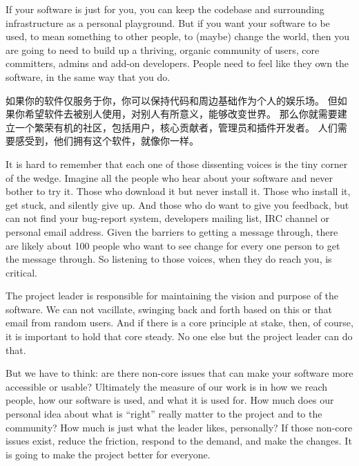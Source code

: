 If your software is just for you, you can keep the codebase and surrounding
infrastructure as a personal playground. But if you want your software to be
used, to mean something to other people, to (maybe) change the world, then
you are going to need to build up a thriving, organic community of users, core
committers, admins and add-on developers. People need to feel like they own the
software, in the same way that you do.

如果你的软件仅服务于你，你可以保持代码和周边基础作为个人的娱乐场。
但如果你希望软件去被别人使用，对别人有所意义，能够改变世界。
那么你就需要建立一个繁荣有机的社区，包括用户，核心贡献者，管理员和插件开发者。
人们需要感受到，他们拥有这个软件，就像你一样。

It is hard to remember that each one of those dissenting voices is the tiny
corner of the wedge. Imagine all the people who hear about your software and
never bother to try it. Those who download it but never install it. Those who
install it, get stuck, and silently give up. And those who do want to give you
feedback, but can not find your bug-report system, developers mailing list, IRC
channel or personal email address. Given the barriers to getting a message
through, there are likely about 100 people who want to see change for
every one person to get the message through. So listening to those voices, when
they do reach you, is critical.

The project leader is responsible for maintaining the vision and purpose of the
software. We can not vacillate, swinging back and forth based on this or that
email from random users. And if there is a core principle at stake, then, of
course, it is important to hold that core steady. No one else but the project
leader can do that.

But we have to think: are there non-core issues that can make your software more
accessible or usable? Ultimately the measure of our work is in how we reach people, how our software is used, and what it is used for. How much does our personal idea about what is ``right'' really matter to the project and to the community? How much is just what the leader likes, personally? If those non-core issues exist, reduce the friction, respond to the demand, and make the changes. It is going to make the project better for everyone.
